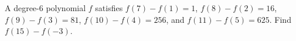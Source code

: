 A degree-$6$ polynomial $f$ satisfies $f(7)-f(1)=1$, $f(8)-f(2)=16$, $f(9)-f(3)=81$, $f(10)-f(4)=256$, and $f(11)-f(5)=625$. Find $f(15)-f(-3)$.

